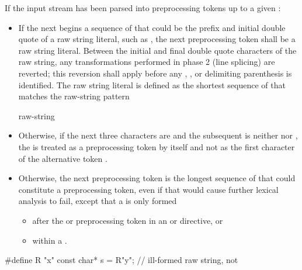 \documentclass{wg21}
\begin{document}
\pnum
If the input stream has been parsed into preprocessing tokens up to a
given :
\begin{itemize}
    \item
    If the next  begins a sequence of  that could be the prefix
    and initial double quote of a raw string literal, such as , the next preprocessing
    token shall be a raw string literal. Between the initial and final
    double quote characters of the raw string, any transformations performed in phase
    2 (line splicing) are reverted; this reversion
    shall apply before any , , or delimiting
    parenthesis is identified. The raw string literal is defined as the shortest sequence
    of  that matches the raw-string pattern
    \begin{ncbnf}
          raw-string
    \end{ncbnf}

    \item Otherwise, if the next three characters are \tcode{<::} and the subsequent 
    is neither \tcode{:} nor \tcode{>}, the \tcode{<} is treated as a preprocessing token by
    itself and not as the first character of the alternative token \tcode{<:}.

    \item Otherwise,
    the next preprocessing token is the longest sequence of
     that could constitute a preprocessing token, even if that
    would cause further lexical analysis to fail,
    except that a  is only formed
    \begin{itemize}
        \item
        after the  or  preprocessing token in an
         or
         directive, or

        \item
        within a .

    \end{itemize}
\end{itemize}

\begin{example}
    \begin{codeblock}
        #define R "x"
        const char* s = R"y";           // ill-formed raw string, not 
    \end{codeblock}
\end{example}
\end{document}
